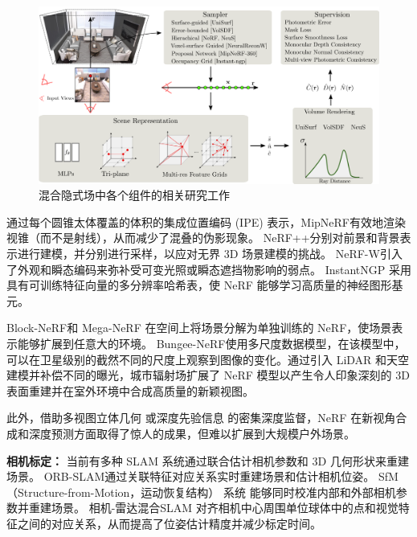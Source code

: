 \begin{figure}[t]
    \centering
    \includegraphics[width=\textwidth]{undergraduate-thesis/images/related-work/sdfstudio.png}
    \caption{混合隐式场中各个组件的相关研究工作\cite{yu_sdfstudio_2022}}
    \label{fig:related-work sdfstudio}
\end{figure}

通过每个圆锥太体覆盖的体积的集成位置编码 (IPE) 表示，MipNeRF\cite{barron_mip-nerf_2021}有效地渲染视锥（而不是射线），从而减少了混叠的伪影现象。 NeRF++\cite{zhang_nerf_2020}分别对前景和背景表示进行建模，并分别进行采样，以应对无界 3D 场景建模的挑战。 NeRF-W\cite{martin-brualla_nerf_2021}引入了外观和瞬态编码来弥补受可变光照或瞬态遮挡物影响的弱点。 InstantNGP\cite{muller_instant_2022} 采用具有可训练特征向量的多分辨率哈希表，使 NeRF 能够学习高质量的神经图形基元。

Block-NeRF\cite{tancik_block-nerf_2022}和 Mega-NeRF\cite{turki_mega-nerf_2022} 在空间上将场景分解为单独训练的 NeRF，使场景表示能够扩展到任意大的环境。 Bungee-NeRF\cite{xiangli_bungeenerf_2022}使用多尺度数据模型，在该模型中，可以在卫星级别的截然不同的尺度上观察到图像的变化。通过引入 LiDAR 和天空建模并补偿不同的曝光，城市辐射场\cite{rematas_urban_2022}扩展了 NeRF 模型以产生令人印象深刻的 3D 表面重建并在室外环境中合成高质量的新颖视图。

此外，借助多视图立体几何\cite{deng_depth-supervised_2022} 或深度先验信息\cite{roessle_dense_2022} 的密集深度监督，NeRF 在新视角合成和深度预测方面取得了惊人的成果，但难以扩展到大规模户外场景。


\textbf{相机标定：}
当前有多种 SLAM 系统通过联合估计相机参数和 3D 几何形状来重建场景。 ORB-SLAM\cite{mur-artal_orb-slam_2015}通过关联特征对应关系实时重建场景和估计相机位姿。 SfM（Structure-from-Motion，运动恢复结构） 系统\cite{schonberger_structure--motion_2016, chen_uncertainty-driven_2023} 能够同时校准内部和外部相机参数并重建场景。 相机-雷达混合SLAM\cite{kong_vmap_2023, deng_nerf-loam_2023} 对齐相机中心周围单位球体中的点和视觉特征之间的对应关系，从而提高了位姿估计精度并减少标定时间。

